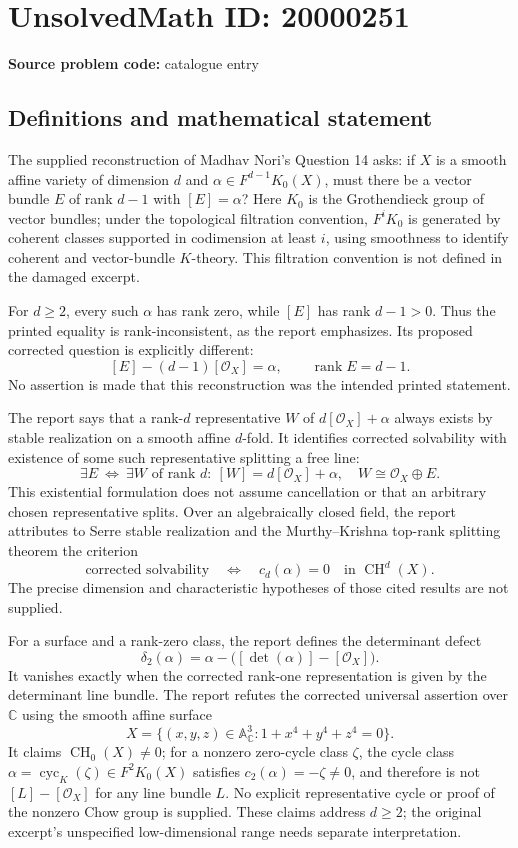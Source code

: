 \documentclass[11pt]{article}
\newcommand{\C}{\mathbb{C}}
\newcommand{\A}{\mathbb{A}}
\begin{document}
\section*{UnsolvedMath ID: 20000251}
\textbf{Source problem code:} catalogue entry
\subsection{Definitions and mathematical statement}
The supplied reconstruction of Madhav Nori's Question 14 asks: if $X$ is a smooth affine variety of dimension $d$ and $\alpha\in F^{d-1}K_0(X)$, must there be a vector bundle $E$ of rank $d-1$ with $[E]=\alpha$? Here $K_0$ is the Grothendieck group of vector bundles; under the topological filtration convention, $F^iK_0$ is generated by coherent classes supported in codimension at least $i$, using smoothness to identify coherent and vector-bundle $K$-theory. This filtration convention is not defined in the damaged excerpt.

For $d\geq2$, every such $\alpha$ has rank zero, while $[E]$ has rank $d-1>0$. Thus the printed equality is rank-inconsistent, as the report emphasizes. Its proposed corrected question is explicitly different:
\[
 [E]-(d-1)[\mathcal O_X]=\alpha,\qquad\operatorname{rank}E=d-1.
\]
No assertion is made that this reconstruction was the intended printed statement.

The report says that a rank-$d$ representative $W$ of $d[\mathcal O_X]+\alpha$ always exists by stable realization on a smooth affine $d$-fold. It identifies corrected solvability with existence of some such representative splitting a free line:
\[
 \exists E\ \Longleftrightarrow\
 \exists W\text{ of rank }d:\ [W]=d[\mathcal O_X]+\alpha,
 \quad W\cong\mathcal O_X\oplus E.
\]
This existential formulation does not assume cancellation or that an arbitrary chosen representative splits. Over an algebraically closed field, the report attributes to Serre stable realization and the Murthy--Krishna top-rank splitting theorem the criterion
\[
 \text{corrected solvability}\quad\Longleftrightarrow\quad
 c_d(\alpha)=0\quad\text{in }\operatorname{CH}^d(X).
\]
The precise dimension and characteristic hypotheses of those cited results are not supplied.

For a surface and a rank-zero class, the report defines the determinant defect
\[
 \delta_2(\alpha)=\alpha-\bigl([\det(\alpha)]-[\mathcal O_X]\bigr).
\]
It vanishes exactly when the corrected rank-one representation is given by the determinant line bundle. The report refutes the corrected universal assertion over $\C$ using the smooth affine surface
\[
 X=\{(x,y,z)\in\A^3_{\C}:1+x^4+y^4+z^4=0\}.
\]
It claims $\operatorname{CH}_0(X)\ne0$; for a nonzero zero-cycle class $\zeta$, the cycle class $\alpha=\operatorname{cyc}_K(\zeta)\in F^2K_0(X)$ satisfies $c_2(\alpha)=-\zeta\ne0$, and therefore is not $[L]-[\mathcal O_X]$ for any line bundle $L$. No explicit representative cycle or proof of the nonzero Chow group is supplied. These claims address $d\geq2$; the original excerpt's unspecified low-dimensional range needs separate interpretation.
\end{document}
